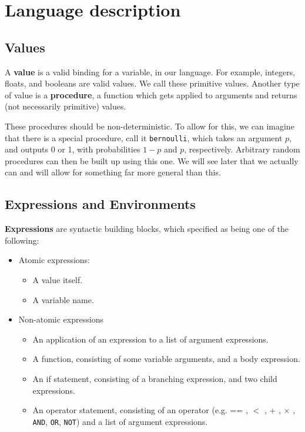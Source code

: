 \documentclass[11pt]{article}
\begin{document}



\section{Language description}

\subsection{Values}

A {\bf value} is a valid binding for a variable, in our language.  For example, integers, floats, and booleans are valid values.  We call these primitive values.  Another type of value is a {\bf procedure}, a function which gets applied to arguments and returns (not necessarily primitive) values.  

These procedures should be non-deterministic.  To allow for this, we can imagine that there is a special procedure, call it {\tt bernoulli}, which takes an argument $p$, and outputs 0 or 1, with probabilities $1-p$ and $p$, respectively.  Arbitrary random procedures can then be built up using this one.   We will see later that we actually can and will allow for something far more general than this.



\subsection{Expressions and Environments}

{\bf Expressions} are syntactic building blocks, which specified as being one of the following:
\begin{itemize}
\item Atomic expressions:
\begin{itemize}
\item A value itself.
\item A variable name.
\end{itemize}
\item Non-atomic expressions
\begin{itemize}
\item An application of an expression to a list of argument expressions.
\item A function, consisting of some variable arguments, and a body expression.
\item An if statement, consisting of a branching expression, and two child expressions.
\item An operator statement, consisting of an operator (e.g. == , $<$ , + , $\times$ , {\tt AND}, {\tt OR}, {\tt NOT}) and a list of argument expressions.
\end{itemize}
\end{itemize}
\end{document}
